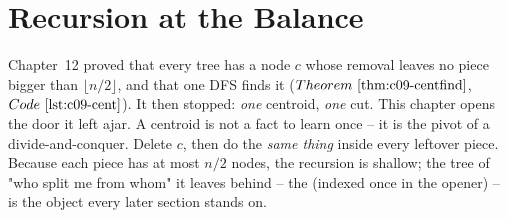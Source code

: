 \section{Recursion at the Balance}\label{sec:c18-tree}

\begin{previouslybox}
Chapter~12 proved that every tree has a node \(c\) whose removal leaves no piece
bigger than \(\lfloor n/2\rfloor\), and that one DFS finds it
(\(\thmref{c09-centfind}\), \(\coderef{c09-cent}\)). It then stopped: \emph{one}
centroid, \emph{one} cut. This chapter opens the door it left ajar. A centroid is
not a fact to learn once -- it is the pivot of a divide-and-conquer. Delete \(c\),
then do the \emph{same thing} inside every leftover piece. Because each piece has
at most \(n/2\) nodes, the recursion is shallow; the tree of "who split me from
whom" it leaves behind -- the  (indexed once in the opener) --
is the object every later section stands on.
\end{previouslybox}

